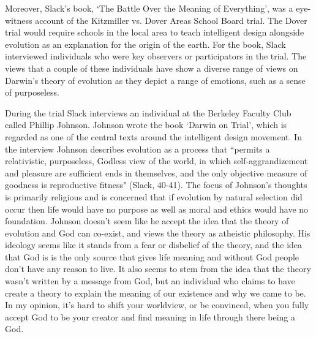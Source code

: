 \documentclass[11pt, oneside]{article}
\begin{document}


\par Moreover, Slack's book, `The Battle Over the Meaning of Everything', was a eye-witness account of the Kitzmiller vs. Dover Areas School Board trial. The Dover trial would require schools in the local area to teach intelligent design alongside evolution as an explanation for the origin of the earth. For the book, Slack interviewed individuals who were key observers or participators in the trial. The views that a couple of these individuals have show a diverse range of views on Darwin's theory of evolution as they depict a range of emotions, such as a sense of purposeless. 

\par During the trial Slack interviews an individual at the Berkeley Faculty Club called Phillip Johnson. Johnson wrote the book `Darwin on Trial', which is regarded as one of the central texts around the intelligent design movement. In the interview Johnson describes evolution as a process that ``permits a relativistic, purposeless, Godless view of the world, in which self-aggrandizement and pleasure are sufficient ends in themselves, and the only objective measure of goodness is reproductive fitness" (Slack, 40-41). The focus of Johnson's thoughts is primarily religious and is concerned that if evolution by natural selection did occur then life would have no purpose as well as moral and ethics would have no foundation. Johnson doesn't seem like he accept the idea that the theory of evolution and God can co-exist, and views the theory as atheistic philosophy. His ideology seems like it stands from a fear or disbelief of the theory, and the idea that God is is the only source that gives life meaning and without God people don't have any reason to live. It also seems to stem from the idea that the theory wasn't written by a message from God, but an individual who claims to have create a theory to explain the meaning of our existence and why we came to be. In my opinion, it's hard to shift your worldview, or be convinced, when you fully accept God to be your creator and find meaning in life through there being a God.
\end{document}

